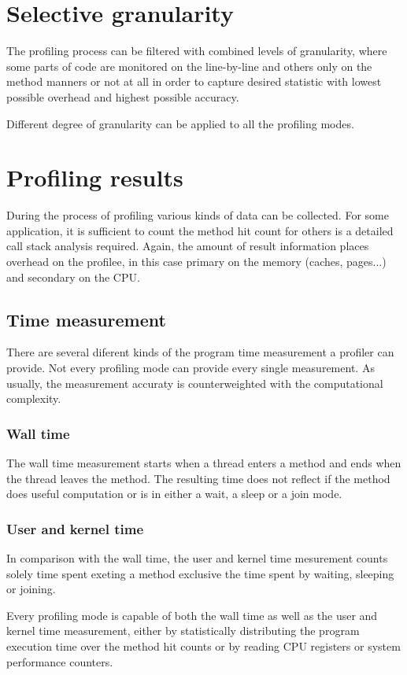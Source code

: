 \section{Selective granularity}
The profiling process can be filtered with combined levels of granularity, where some parts of code are monitored on the line-by-line and others only on the method manners or not at all in order to capture desired statistic with lowest possible overhead and highest possible accuracy.

Different degree of granularity can be applied to all the profiling modes.

\section{Profiling results}
During the process of profiling various kinds of data can be collected. For some application, it is sufficient to count the method hit count for others is a detailed call stack analysis required. Again, the amount of result information places overhead on the profilee, in this case primary on the memory (caches, pages...) and secondary on the CPU.

\subsection{Time measurement}
There are several diferent kinds of the program time measurement a profiler can provide. Not every profiling mode can provide every single measurement. As usually, the measurement accuraty is counterweighted with the computational complexity.

\subsubsection*{Wall time}
The wall time measurement starts when a thread enters a method and ends when the thread leaves the method. The resulting time does not reflect if the method does useful computation or is in either a wait, a sleep or a join mode.


\subsubsection*{User and kernel time}
In comparison with the wall time, the user and kernel time mesurement counts solely time spent exeting a method exclusive the time spent by waiting, sleeping or joining.

Every profiling mode is capable of both the wall time as well as the user and kernel time measurement, either by statistically distributing the program execution time over the method hit counts or by reading CPU registers or system performance counters.

